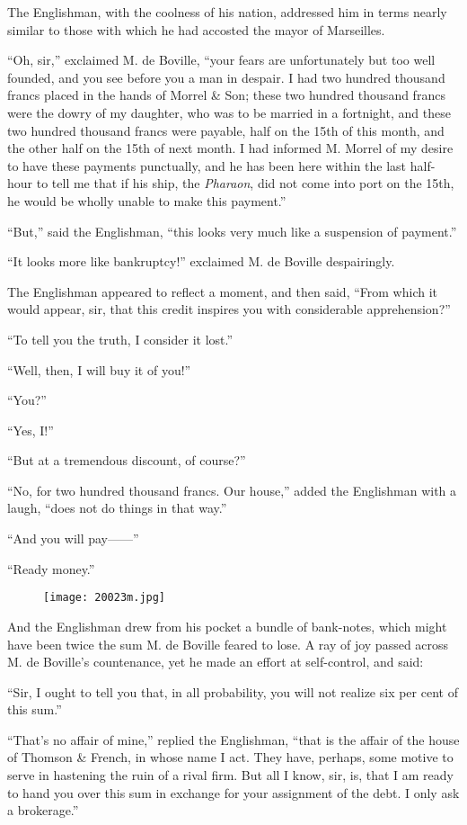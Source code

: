 The Englishman, with the coolness of his nation, addressed him in terms
nearly similar to those with which he had accosted the mayor of
Marseilles.

“Oh, sir,” exclaimed M. de Boville, “your fears are unfortunately but
too well founded, and you see before you a man in despair. I had two
hundred thousand francs placed in the hands of Morrel \& Son; these two
hundred thousand francs were the dowry of my daughter, who was to be
married in a fortnight, and these two hundred thousand francs were
payable, half on the 15th of this month, and the other half on the 15th
of next month. I had informed M. Morrel of my desire to have these
payments punctually, and he has been here within the last half-hour to
tell me that if his ship, the \textit{Pharaon}, did not come into port on the
15th, he would be wholly unable to make this payment.”

“But,” said the Englishman, “this looks very much like a suspension of
payment.”

“It looks more like bankruptcy!” exclaimed M. de Boville despairingly.

The Englishman appeared to reflect a moment, and then said, “From which
it would appear, sir, that this credit inspires you with considerable
apprehension?”

“To tell you the truth, I consider it lost.”

“Well, then, I will buy it of you!”

“You?”

“Yes, I!”

“But at a tremendous discount, of course?”

“No, for two hundred thousand francs. Our house,” added the Englishman
with a laugh, “does not do things in that way.”

“And you will pay——”

“Ready money.”

\begin{figure}[ht]
\texttt{[image: 20023m.jpg]}
\end{figure}

And the Englishman drew from his pocket a bundle of bank-notes, which
might have been twice the sum M. de Boville feared to lose. A ray of
joy passed across M. de Boville’s countenance, yet he made an effort at
self-control, and said:

“Sir, I ought to tell you that, in all probability, you will not
realize six per cent of this sum.”

“That’s no affair of mine,” replied the Englishman, “that is the affair
of the house of Thomson \& French, in whose name I act. They have,
perhaps, some motive to serve in hastening the ruin of a rival firm.
But all I know, sir, is, that I am ready to hand you over this sum in
exchange for your assignment of the debt. I only ask a brokerage.”

